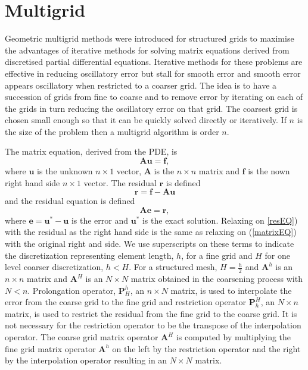 \section{Multigrid}
Geometric multigrid methods were introduced for structured grids to maximise the advantages of iterative methods for solving matrix equations derived from discretised partial differential equations.  Iterative methods for these problems are effective in reducing oscillatory error but stall for smooth error and smooth error appears oscillatory when restricted to a coarser grid.  The idea is to have a succession of grids from fine to coarse and to remove error by iterating on each of the grids in turn reducing the oscillatory error on that grid.  The coarsest grid is chosen small enough so that it can be quickly solved directly or iteratively. If $n$ is the size of the problem then a multigrid algorithm is order $n$.

The matrix equation,  derived from the PDE, is
\begin{equation}\label{matrixEQ}
    \mathbf{A}\mathbf{u}=\mathbf{f},
\end{equation}
where $\mathbf{u}$ is the unknown $n\times 1$ vector, $\mathbf{A}$ is the $n\times n$ matrix and $\mathbf{f}$ is the nown right hand side $n\times 1$ vector.  The residual $\mathbf{r}$ is defined
\begin{equation}\label{res}
    \mathbf{r}=\mathbf{f}-\mathbf{A}\mathbf{u}%
\end{equation}
and the residual equation is defined 
\begin{equation}\label{resEQ}
    \mathbf{A}\mathbf{e}=\mathbf{r},
\end{equation}
where $\mathbf{e}=\mathbf{u}^*-\mathbf{u}$ is the error and $\mathbf{u}^*$ is the exact solution.  Relaxing on \ref{resEQ}) with the residual as the right hand side is the same as relaxing on (\ref{matrixEQ}) with the original right and side.  We use superscripts on these terms to indicate the discretization representing element length, $h$, for a fine grid and $H$ for one level coarser discretization, $h<H$.  For a structured mesh, $H=\frac{h}{2}$ and $\mathbf{A}^h$ is an $n\times n$ matrix and $\mathbf{A}^H$ is an $N\times N$ matrix obtained in the coarsening process with $N<n$.  Prolongation operator, $\mathbf{P}^h_H$, an $n\times N$ matrix, is used to interpolate the error from the coarse grid to the fine grid and restriction operator $\mathbf{P}_h^H$, an $N\times n$ matrix, is used to restrict the residual from the fine grid to the coarse grid.  It is not necessary for the restriction operator to be the transpose of the interpolation operator.  The coarse grid matrix operator $\mathbf{A}^H$ is computed by multiplying the fine grid matrix operator $\mathbf{A}^h$ on the left by the restriction operator and the right by the interpolation operator resulting in an $N\times N$ matrix.  

